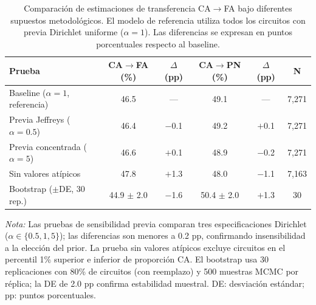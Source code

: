 \begin{table}[htbp]
\centering
\caption{Comparación de estimaciones de transferencia CA$\to$FA bajo diferentes supuestos metodológicos. El modelo de referencia utiliza todos los circuitos con previa Dirichlet uniforme ($\alpha=1$). Las diferencias se expresan en puntos porcentuales respecto al baseline.}
\label{tab:sensitivity}
\small
\begin{tabular}{lccccc}
\toprule
\textbf{Prueba} & \textbf{CA$\to$FA (\%)} & \textbf{$\Delta$ (pp)} & \textbf{CA$\to$PN (\%)} & \textbf{$\Delta$ (pp)} & \textbf{N} \\
\midrule
Baseline ($\alpha=1$, referencia)     & 46.5 & ---     & 49.1 & ---     & 7{,}271 \\
Previa Jeffreys ($\alpha=0.5$)        & 46.4 & $-$0.1  & 49.2 & $+$0.1  & 7{,}271 \\
Previa concentrada ($\alpha=5$)       & 46.6 & $+$0.1  & 48.9 & $-$0.2  & 7{,}271 \\
Sin valores atípicos                  & 47.8 & $+$1.3  & 48.0 & $-$1.1  & 7{,}163 \\
Bootstrap ($\pm$DE, 30 rep.)          & 44.9 $\pm$ 2.0 & $-$1.6     & 50.4 $\pm$ 2.0 & $+$1.3     & 30 \\
\bottomrule
\end{tabular}
\begin{flushleft}
\small \textit{Nota:} Las pruebas de sensibilidad previa comparan tres especificaciones Dirichlet ($\alpha \in \{0.5, 1, 5\}$); las diferencias son menores a 0.2 pp, confirmando insensibilidad a la elección del prior. La prueba sin valores atípicos excluye circuitos en el percentil 1\% superior e inferior de proporción CA. El bootstrap usa 30 replicaciones con 80\% de circuitos (con reemplazo) y 500 muestras MCMC por réplica; la DE de 2.0 pp confirma estabilidad muestral. DE: desviación estándar; pp: puntos porcentuales.
\end{flushleft}
\end{table}
